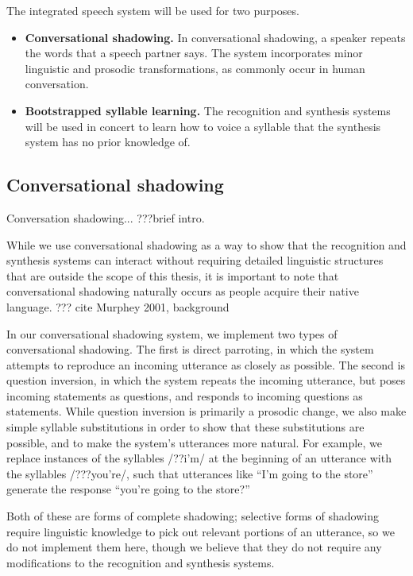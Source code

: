 The integrated speech system
will be used for two purposes.

\begin{itemize}
\item \textbf{Conversational shadowing.} In conversational shadowing,
  a speaker repeats the words that a speech partner says.
  The system incorporates minor linguistic and prosodic transformations,
  as commonly occur in human conversation.
\item \textbf{Bootstrapped syllable learning.}
  The recognition and synthesis systems
  will be used in concert to learn how to voice a syllable
  that the synthesis system has no prior knowledge of.
\end{itemize}

\subsection{Conversational shadowing}

Conversation shadowing... ???brief intro.

While we use conversational shadowing
as a way to show that the recognition
and synthesis systems can interact
without requiring detailed linguistic structures
that are outside the scope of this thesis,
it is important to note that conversational shadowing
naturally occurs as people acquire their native language.
??? cite Murphey 2001, background

In our conversational shadowing system,
we implement two types of conversational shadowing.
The first is direct parroting, in which
the system attempts to reproduce
an incoming utterance as closely as possible.
The second is question inversion, in which
the system repeats the incoming utterance,
but poses incoming statements as questions,
and responds to incoming questions as statements.
While question inversion is primarily
a prosodic change,
we also make simple syllable substitutions
in order to show that these substitutions are possible,
and to make the system's utterances more natural.
For example, we replace instances of the syllables
/??i'm/ at the beginning of an utterance
with the syllables /???you're/,
such that utterances like
``I'm going to the store''
generate the response
``you're going to the store?''

Both of these are forms of complete shadowing;
selective forms of shadowing require linguistic knowledge
to pick out relevant portions of an utterance,
so we do not implement them here,
though we believe that they
do not require any modifications
to the recognition and synthesis systems.

